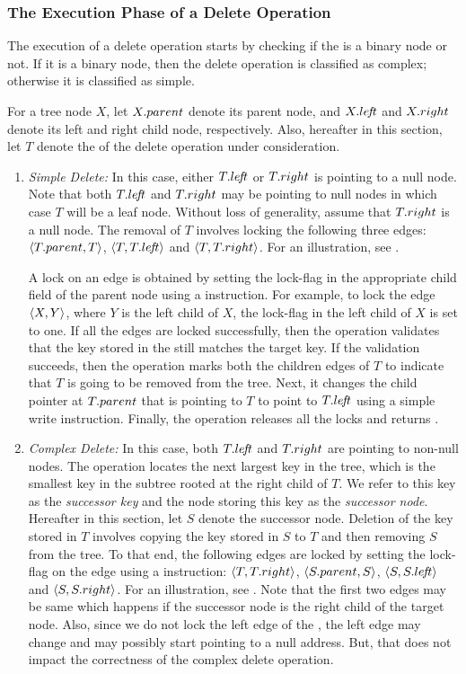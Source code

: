\subsubsection{The Execution Phase of a Delete Operation}
The execution of a delete operation starts by checking if the \targetnode{} is a binary node or not. If it is a binary node, then the delete operation is classified as complex; otherwise it is classified as simple. 

For a tree node $X$, let $X.parent$ denote its parent node, and $X.le\!f\!t$ and $X.right$ denote its left and right child node, respectively. Also, hereafter in this section, let $T$ denote the \targetnode{} of the delete operation under consideration.
\begin{enumerate}[label=(\alph*)]
\item \emph{Simple Delete:}
In this case, either $T.le\!f\!t$ or $T.right$ is pointing to a null node. Note that both $T.le\!f\!t$ and $T.right$ may be pointing to null nodes in which case $T$ will be a leaf node. Without loss of generality, assume that $T.right$ is a null node. The removal of $T$ involves locking the following three edges: $\langle {T.parent}, {T} \rangle$, $\langle {T}, {T.le\!f\!t} \rangle$ and $\langle {T}, {T.right} \rangle$. For an illustration, see .


A lock on an edge is obtained by setting the lock-flag in the appropriate child field of the parent node using a \CAS{} instruction. For example, to lock the edge $\langle {X}, {Y} \rangle$, where $Y$ is the left child of $X$, the lock-flag in the left child of $X$ is set to one. If all the edges are locked successfully, then the operation validates that the key stored in the \targetnode{} still matches the target key. If the validation succeeds, then the operation marks both the children edges of $T$  to indicate that $T$ is going to be removed from the tree. Next, it changes the child pointer at $T.parent$ that is pointing to $T$ to point to $T.le\!f\!t$ using a simple write instruction. Finally, the operation releases all the locks and returns \true{}. 

\item \emph{Complex Delete:}
In this case, both $T.le\!f\!t{}$ and $T.right{}$ are pointing to non-null nodes. The operation locates the next largest key in the tree, which is the smallest key in the subtree rooted at the right child of $T$. We refer to this key as the \emph{successor key} and the node storing this key as the \emph{successor node}. Hereafter in this section, let 
$S$ denote the successor node. Deletion of the key stored in $T$ involves copying  the key stored in $S$ to $T$ and then removing $S$ from the tree. To that end, the following edges are locked by setting the lock-flag on the edge using a \CAS{} instruction: $\langle {T}, {T.right} \rangle$, $\langle {S.parent}, {S} \rangle$, $\langle {S}, {S.le\!f\!t} \rangle$ and $\langle {S}, {S.right} \rangle$. For an illustration, see . Note that the first two edges may be same which happens if the successor node is the right child of the target node. Also, since we do not lock the left edge of the \targetnode{}, the left edge may change and may possibly start pointing to a null address. But, that does not impact the correctness of the complex delete operation.


\end{enumerate}
